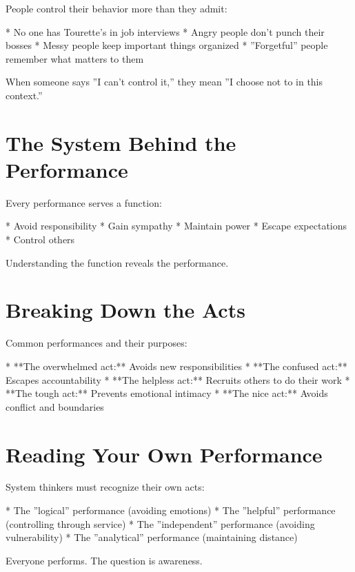 \documentclass[12pt,oneside]{book}
\begin{document}
People control their behavior more than they admit:

                    * No one has Tourette's in job interviews
                    * Angry people don't punch their bosses
                    * Messy people keep important things organized
                    * ''Forgetful'' people remember what matters to them

When someone says ''I can't control it,'' they mean ''I choose not to in this context.''

\section{The System Behind the Performance}

Every performance serves a function:

                    * Avoid responsibility
                    * Gain sympathy
                    * Maintain power
                    * Escape expectations
                    * Control others

Understanding the function reveals the performance.

\section{Breaking Down the Acts}

Common performances and their purposes:

                    * **The overwhelmed act:** Avoids new responsibilities
                    * **The confused act:** Escapes accountability
                    * **The helpless act:** Recruits others to do their work
                    * **The tough act:** Prevents emotional intimacy
                    * **The nice act:** Avoids conflict and boundaries

\section{Reading Your Own Performance}

System thinkers must recognize their own acts:

                    * The ''logical'' performance (avoiding emotions)
                    * The ''helpful'' performance (controlling through service)
                    * The ''independent'' performance (avoiding vulnerability)
                    * The ''analytical'' performance (maintaining distance)

Everyone performs. The question is awareness.
\end{document}
